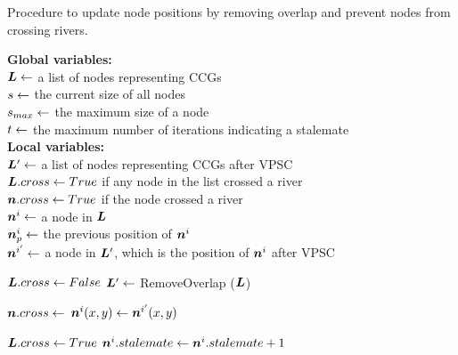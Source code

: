 \begin{algorithm}[tb!]
    \caption{Procedure to update node positions by removing overlap and prevent nodes from crossing rivers.}\label{alg:UpdateNodePosition}
    \textbf{Global variables:} \\
    $ \bm{L} \gets $ a list of nodes representing CCGs \\
    $ s \gets $ the current size of all nodes \\
    $ s_{max} \gets $ the maximum size of a node \\
    $ t \gets $ the maximum number of iterations indicating a stalemate \\

    \textbf{Local variables:} \\
    $ \bm{L}' \gets $ a list of nodes representing CCGs after VPSC \\
    $ \bm{L}.cross \gets True $ if any node in the list crossed a river \\
    $ \bm{n}.cross \gets True $ if the node crossed a river \\
    $ \bm{n}^i \gets $ a node in $ \bm{L} $ \\
    $ \bm{n}^i_{p} \gets $ the previous position of $ \bm{n}^i $\\
    $ \bm{n}^{i'} \gets $ a node in $ \bm{L}' $, which is the position of $ \bm{n}^i $ after VPSC \\

    \begin{algorithmic}[1]
        \While{$ \nodeSize < \nodeSizeMax $}


                \State $ \bm{L}.cross \gets False $
                \State $ \bm{L}' \gets $ RemoveOverlap ($ \bm{L} $)

                \ForEach {$ \nodeListVPSCEach \in \nodeListVPSC $}


                        \State $ \bm{n}.cross \gets $ 
                        \State $ \bm{n}^i(x,y) \gets \bm{n}^{i'}(x,y) $


                            \State $ \bm{L}.cross \gets True $
                            \State $ \bm{n}^i.stalemate \gets \bm{n}^i.stalemate + 1 $


\end{algorithmic}
\end{algorithm}
